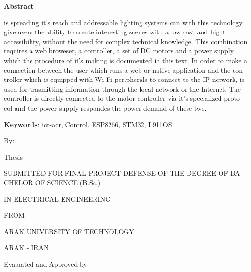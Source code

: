 \newenvironment{bold}{\bfseries}{}

\clearpage
\thispagestyle{empty}

\begin{latin}

{\centering\textbf{Abstract}\par}

 is spreading it's reach and addressable lighting systems can with this technology give users the ability to create interesting scenes with a low cost and hight accessibility, without the need for complex technical knowledge. This combination requires a web broweser, a controller, a set of DC motors and a power supply which the procedure of it's making is documented in this text. In order to make a connection between the user which runs a web or native application and the controller which is equipped with Wi-Fi peripherals to connect to the IP network,  is used for trasmitting information through the local network or the Internet. The controller is directly connected to the motor controller via it's specialized protocol and the power supply respondes the power demand of these two.

\vspace{6mm}\textbf{Keywords}:
\gls{iot-acr},
Control,
ESP8266,
STM32,
L911OS

\clearpage
\thispagestyle{empty}

\begin{center}

\begin{bold}

\vspace*{15mm}\LARGE\titleen\par
\vspace{2cm}\normalsize By:

\Large\authoren

\onehalfspacing
\vspace{2cm}\large Thesis\par
SUBMITTED FOR FINAL PROJECT DEFENSE OF THE DEGREE OF BACHELOR OF SCIENCE (B.Sc.)\par IN ELECTRICAL ENGINEERING\par FROM\par ARAK UNIVERSITY OF TECHNOLOGY\par ARAK - IRAN
\end{bold}

\doublespacing

Evaluated and Approved by \dotfill


\end{center}
\end{latin}

